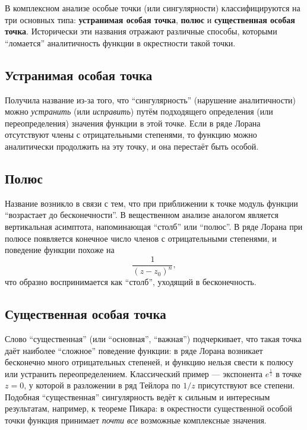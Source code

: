 \documentclass[a4paper,12pt]{article}
\begin{document}
В комплексном анализе особые точки (или сингулярности) классифицируются на три основных типа:
\textbf{устранимая особая точка}, \textbf{полюс} и \textbf{существенная особая точка}.
Исторически эти названия отражают различные способы, которыми ``ломается'' аналитичность функции в окрестности такой точки.

\subsection{Устранимая особая точка}
Получила название из-за того, что ``сингулярность'' (нарушение аналитичности) можно \textit{устранить} (или \textit{исправить}) путём подходящего определения (или переопределения) значения функции в этой точке. 
Если в ряде Лорана отсутствуют члены с отрицательными степенями, то функцию можно аналитически продолжить на эту точку, и она перестаёт быть особой.

\subsection{Полюс}
Название возникло в связи с тем, что при приближении к точке модуль функции ``возрастает до бесконечности''.
В вещественном анализе аналогом является вертикальная асимптота, напоминающая ``столб'' или ``полюс''. 
В ряде Лорана при полюсе появляется конечное число членов с отрицательными степенями, и поведение функции похоже на
\[
\frac{1}{(z - z_0)^n},
\]
что образно воспринимается как ``столб'', уходящий в бесконечность.

\subsection{Существенная особая точка}
Слово ``существенная'' (или ``основная'', ``важная'') подчеркивает, что такая точка даёт наиболее ``сложное'' поведение функции:
в ряде Лорана возникает бесконечно много отрицательных степеней, и функцию нельзя свести к полюсу или устранить переопределением.
Классический пример --- экспонента \( e^{\tfrac{1}{z}} \) в точке \( z = 0 \), у которой в разложении в ряд Тейлора по \( 1/z \) присутствуют все степени.
Подобная ``существенная'' сингулярность ведёт к сильным и интересным результатам, например, к теореме Пикара:
в окрестности существенной особой точки функция принимает \emph{почти все} возможные комплексные значения.
\end{document}
